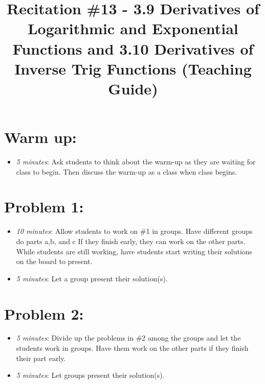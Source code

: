 \documentclass[handout,nooutcomes]{ximera}
\title{Recitation \#13 - 3.9 Derivatives of Logarithmic and Exponential Functions and 3.10 Derivatives of Inverse Trig Functions (Teaching Guide)}
\begin{document}
\begin{abstract}		\end{abstract}
\maketitle


\section*{Warm up:} 
	
	\begin{itemize}
	
	\item  \emph{5 minutes}:  Ask students to think about the warm-up as they are waiting for class to begin.  Then discuss the warm-up as a class when class begins.
	
	
	
	\end{itemize}


\section*{Problem 1:}

	\begin{itemize}
	
	\item  \emph{10 minutes}:  Allow students to work on \#1 in groups. Have different groups do parts a,b, and c  If they finish early, they can work on the other parts.  While students are still working, have students start writing their solutions on the board to present.
	
	\item  \emph{5 minutes}:  Let a group present their solution(s).
	
	\end{itemize}




\section*{Problem 2:}

	\begin{itemize}
	
	\item  \emph{5 minutes}:  Divide up the problems in \#2 among the groups and let the students work in groups.  Have them work on the other parts if they finish their part early. 
		
	\item  \emph{5 minutes}:  Let groups present their solution(s).
			
	\end{itemize}
	
\end{document}

